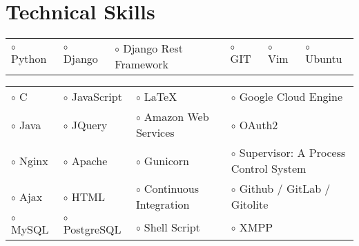 \documentclass[11pt]{article}
\begin{document}
\section*{Technical Skills}

\begin{tabular}{l l l l l l}
 $\circ$ Python &
 $\circ$ Django &
 $\circ$ Django Rest Framework &
 $\circ$ GIT &
 $\circ$ Vim &
 $\circ$ Ubuntu \\
\end{tabular}

\begin{tabular}{l l l l}
 $\circ$ C &
 $\circ$ JavaScript &
 $\circ$ \LaTeX{} &
 $\circ$ Google Cloud Engine \\
 $\circ$ Java &
 $\circ$ JQuery &
 $\circ$ Amazon Web Services &
 $\circ$ OAuth2 \\
 $\circ$ Nginx &
 $\circ$ Apache &
 $\circ$ Gunicorn &
 $\circ$ Supervisor: A Process Control System \\
 $\circ$ Ajax &
 $\circ$ HTML &
 $\circ$ Continuous Integration &
 $\circ$ Github / GitLab / Gitolite \\
 $\circ$ MySQL &
 $\circ$ PostgreSQL &
 $\circ$ Shell Script &
 $\circ$ XMPP \\
\end{tabular}
\end{document}
